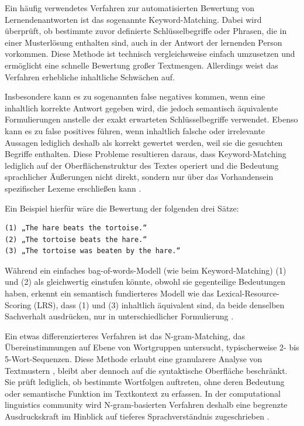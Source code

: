 \documentclass[a4paper,12pt]{article}
\begin{document}
Ein häufig verwendetes Verfahren zur automatisierten Bewertung von Lernendenantworten ist das sogenannte Keyword-Matching. Dabei wird überprüft, ob bestimmte zuvor definierte Schlüsselbegriffe oder Phrasen, die in einer Musterlösung enthalten sind, auch in der Antwort der lernenden Person vorkommen. Diese Methode ist technisch vergleichsweise einfach umzusetzen und ermöglicht eine schnelle Bewertung großer Textmengen. Allerdings weist das Verfahren erhebliche inhaltliche Schwächen auf.

Insbesondere kann es zu sogenannten false negatives kommen, wenn eine inhaltlich korrekte Antwort gegeben wird, die jedoch semantisch äquivalente Formulierungen anstelle der exakt erwarteten Schlüsselbegriffe verwendet. Ebenso kann es zu false positives führen, wenn inhaltlich falsche oder irrelevante Aussagen lediglich deshalb als korrekt gewertet werden, weil sie die gesuchten Begriffe enthalten. Diese Probleme resultieren daraus, dass Keyword-Matching lediglich auf der Oberflächenstruktur des Textes operiert und die Bedeutung sprachlicher Äußerungen nicht direkt, sondern nur über das Vorhandensein spezifischer Lexeme erschließen kann \parencite{burrows}.

Ein Beispiel hierfür wäre die Bewertung der folgenden drei Sätze:
\begin{verbatim}
(1) „The hare beats the tortoise.“
(2) „The tortoise beats the hare.“
(3) „The tortoise was beaten by the hare.“
\end{verbatim}
Während ein einfaches bag-of-words-Modell (wie beim Keyword-Matching) (1) und (2) als gleichwertig einstufen könnte, obwohl sie gegenteilige Bedeutungen haben, erkennt ein semantisch fundierteres Modell wie das Lexical-Resource-Scoring (LRS), dass (1) und (3) inhaltlich äquivalent sind, da beide denselben Sachverhalt ausdrücken, nur in unterschiedlicher Formulierung \parencite[S. 74]{burrows}.

Ein etwas differenzierteres Verfahren ist das N-gram-Matching, das Übereinstimmungen auf Ebene von Wortgruppen untersucht, typischerweise 2- bis 5-Wort-Sequenzen. Diese Methode erlaubt eine granularere Analyse von Textmustern \parencite{jurafsky}, bleibt aber dennoch auf die syntaktische Oberfläche beschränkt. Sie prüft lediglich, ob bestimmte Wortfolgen auftreten, ohne deren Bedeutung oder semantische Funktion im Textkontext zu erfassen. In der computational linguistics community wird N-gram-basierten Verfahren deshalb eine begrenzte Ausdruckskraft im Hinblick auf tieferes Sprachverständnis zugeschrieben \parencite{mitkov}.
\end{document}
